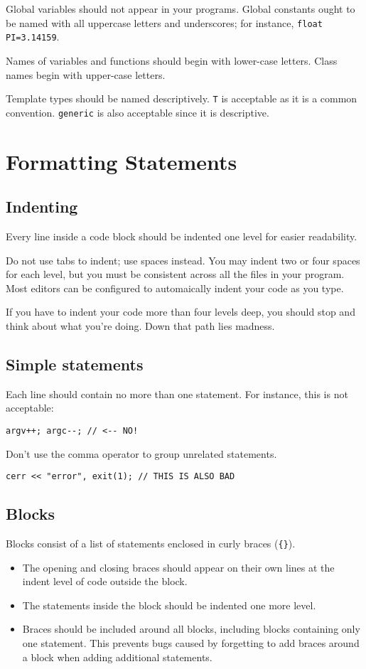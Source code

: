 \documentclass{article}
\newcommand{\code}[1]{\texttt{\colorbox{gray!30}{#1}}}
\begin{document}
Global variables should not appear in your programs.
Global constants ought to be named with all uppercase letters and underscores; for instance, \code{float PI=3.14159}.

Names of variables and functions should begin with lower-case letters.
Class names begin with upper-case letters.

Template types should be named descriptively.
\code{T} is acceptable as it is a common convention.
\code{generic} is also acceptable since it is descriptive.

\section{Formatting Statements}
\subsection{Indenting}
Every line inside a code block should be indented one level for easier readability.

Do not use tabs to indent; use spaces instead.
You may indent two or four spaces for each level, but you must be consistent across all the files in your program.
Most editors can be configured to automaically indent your code as you type.

If you have to indent your code more than four levels deep, you should stop and think about what you're doing.
Down that path lies madness.

\subsection{Simple statements}
Each line should contain no more than one statement.
For instance, this is not acceptable:
\begin{lstlisting}
argv++; argc--; // <-- NO!
\end{lstlisting}

Don't use the comma operator to group unrelated statements.
\begin{lstlisting}
cerr << "error", exit(1); // THIS IS ALSO BAD
\end{lstlisting}

\subsection{Blocks}
Blocks consist of a list of statements enclosed in curly braces (\code{\{\}}).
\begin{itemize}
	\item The opening and closing braces should appear on their own lines at the indent level of code outside the block.
	\item The statements inside the block should be indented one more level.
	\item Braces should be included around all blocks, including blocks containing only one statement.
		This prevents bugs caused by forgetting to add braces around a block when adding additional statements.
\end{itemize}
\end{document}
